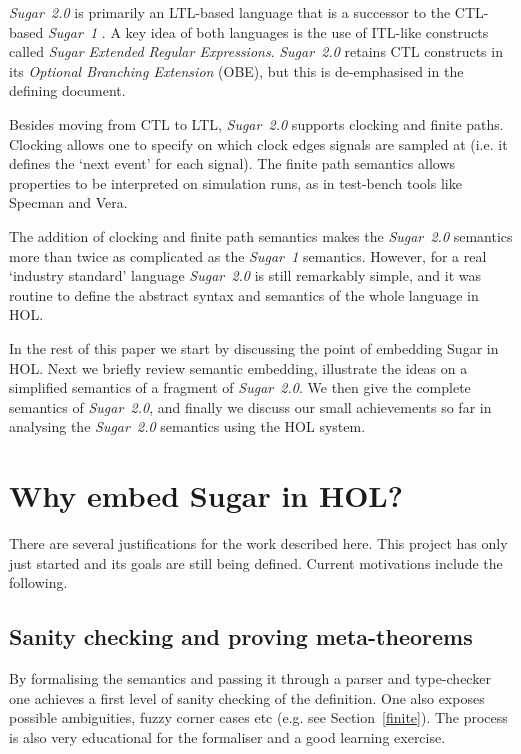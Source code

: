 \documentclass{llncs}
\newcommand\Sugar{{\it{Sugar~2.0}}\xspace}
\newcommand\Hol{HOL\xspace}
\begin{document}
\Sugar is primarily an LTL-based language that is a successor to 
the CTL-based {\it Sugar~1\/} \cite{ClarkeBook}. A key idea of both languages is the use
of ITL-like \cite{ITL} constructs called {\it Sugar Extended Regular Expressions}.
\Sugar retains CTL constructs in its {\it Optional Branching Extension} (OBE),
but this is de-emphasised in the defining document.

Besides moving from CTL to LTL, \Sugar supports clocking and finite
paths.  Clocking allows one to specify on which clock edges signals are
sampled at (i.e. it defines the `next event' for each signal). The
finite path semantics allows properties to be interpreted on
simulation runs, as in test-bench tools like Specman and Vera.

The addition of clocking and finite path semantics makes the \Sugar
semantics more than twice as complicated as the {\it Sugar~1}
semantics. However, for a real `industry standard' language \Sugar is still
remarkably simple, and it was routine to define the abstract syntax
and semantics of the whole language in \Hol \cite{GordonMelham}.

In the rest of this paper we start by discussing the point of
embedding Sugar in \Hol. Next we briefly review semantic embedding,
illustrate the
ideas on a simplified semantics of a fragment of \Sugar.  We then
give the complete semantics of \Sugar, and finally we discuss our
small achievements so far in analysing the \Sugar semantics using the
\Hol system.

\section{Why embed Sugar in \Hol?}

There are several justifications for the work described here. This project
has only just started and its goals are still being defined. Current motivations include
the following.

\subsection{Sanity checking and proving meta-theorems}

By formalising the semantics and passing it through a parser and
type-checker one achieves a first level of sanity checking of the
definition. One also exposes possible ambiguities, fuzzy corner cases etc
(e.g. see Section~\ref{finite}).
The process is also very educational for the formaliser and
a good learning exercise.
\end{document}
